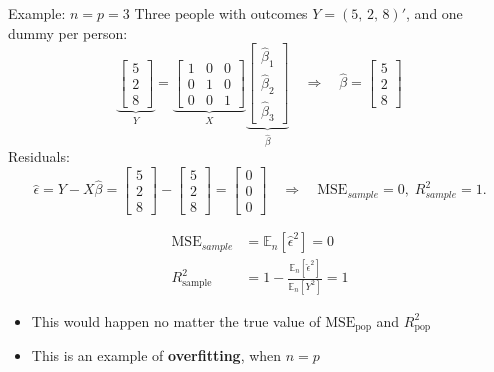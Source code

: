 \documentclass[compress, 8pt]{beamer}
\begin{document}
\begin{frame}{Example: $n = p = 3$}
  Three people with outcomes $Y = (5,\, 2,\, 8)'$, and one dummy per person:
  \[
    \underbrace{\begin{bmatrix} 5 \\ 2 \\ 8 \end{bmatrix}}_{Y}
    =
    \underbrace{\begin{bmatrix}
      1 & 0 & 0 \\
      0 & 1 & 0 \\
      0 & 0 & 1
    \end{bmatrix}}_{X}
    \underbrace{\begin{bmatrix} \hat\beta_1 \\ \hat\beta_2 \\ \hat\beta_3 \end{bmatrix}}_{\hat\beta}
    \quad \Rightarrow \quad
    \hat\beta = \begin{bmatrix} 5 \\ 2 \\ 8 \end{bmatrix}
  \]
  Residuals:
  \[
    \hat\epsilon = Y - X\hat\beta
    = \begin{bmatrix} 5 \\ 2 \\ 8 \end{bmatrix}
    - \begin{bmatrix} 5 \\ 2 \\ 8 \end{bmatrix}
    = \begin{bmatrix} 0 \\ 0 \\ 0 \end{bmatrix}
    \quad \Rightarrow \quad
    \text{MSE}_{sample} = 0,\; R^2_{sample} = 1.
  \]

  \begin{align*}
    \text{MSE}_{sample} &=  \mathbb{E}_n [\hat{\epsilon}^2] = 0 \\
     R^2_{\text{sample}} &= 1 - \frac{\mathbb{E}_n [\hat{\epsilon}^2]}{\mathbb{E}_n [Y^2]} = 1
  \end{align*}

  \begin{itemize}
    \item [$\implies$] This would happen no matter the true value of $\text{MSE}_{\text{pop}}$ and $R^2_{\text{pop} }$
    \item [$\implies$] This is an example of \textbf{overfitting}, when $n=p$
  \end{itemize}
\end{frame}
\end{document}
